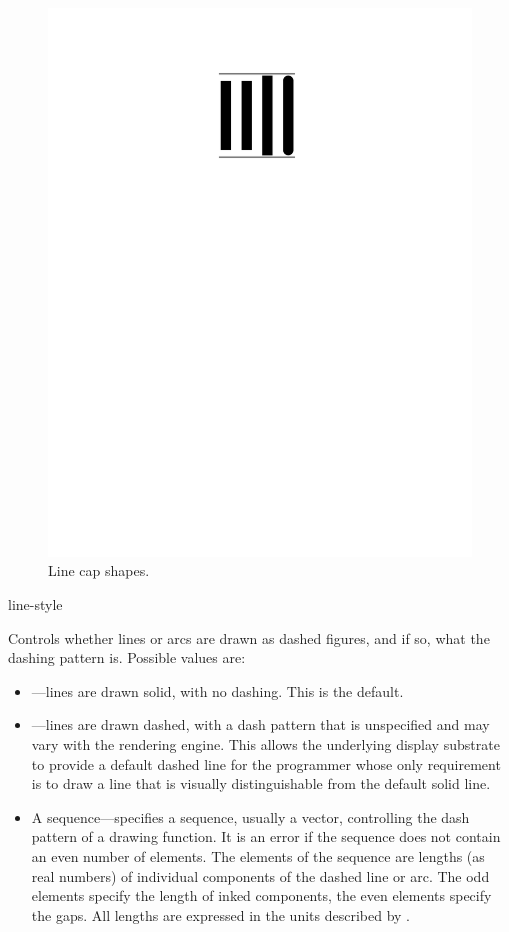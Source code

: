 \begin{figure}
\centerline{\includegraphics{line-cap-shapes}}
\caption{Line cap shapes.}
\end{figure}

 {line-style}

Controls whether lines or arcs are drawn as dashed figures, and if so, what the
dashing pattern is.  Possible values are:

\begin{itemize}
\item {}---lines are drawn solid, with no dashing.  This is the default.

\item {}---lines are drawn dashed, with a dash pattern that is unspecified
and may vary with the rendering engine.  This allows the underlying display
substrate to provide a default dashed line for the programmer whose only
requirement is to draw a line that is visually distinguishable from the default
solid line.

\item A sequence---specifies a sequence, usually a vector, controlling the dash
pattern of a drawing function.  It is an error if the sequence does not contain
an even number of elements.  The elements of the sequence are lengths (as real
numbers) of individual components of the dashed line or arc.  The odd elements
specify the length of inked components, the even elements specify the gaps.  All
lengths are expressed in the units described by .
\end{itemize}

